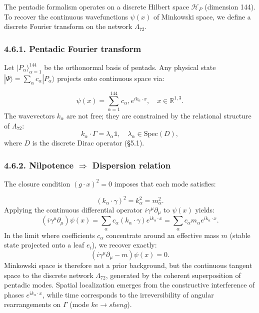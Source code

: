 \documentclass[11pt]{article}
\let\oldmathcal\mathcal
\renewcommand{\mathcal}[1]{\oldmathcal{#1}}
\begin{document}
The pentadic formalism operates on a discrete Hilbert space
\(\mathcal{H}_P\) (dimension 144). To recover the continuous
wavefunctions \(\psi(x)\) of Minkowski space, we define a discrete
Fourier transform on the network \(\Lambda_{72}\).

\hypertarget{pentadic-fourier-transform}{%
\subsubsection{4.6.1. Pentadic Fourier
transform}\label{pentadic-fourier-transform}}

Let \({|P_\alpha\rangle}_{\alpha=1}^{144}\) be the orthonormal basis of
pentads. Any physical state
\(|\Psi\rangle = \sum_\alpha c_\alpha |P_\alpha\rangle\) projects onto
continuous space via:

\[
\psi(x) = \sum_{\alpha=1}^{144} c_\alpha , e^{i k_\alpha \cdot x}, \quad x \in \mathbb{R}^{1,3}.
\] The wavevectors \(k_\alpha\) are not free; they are constrained by
the relational structure of \(\Lambda_{72}\): \[
k_\alpha \cdot \Gamma = \lambda_\alpha \mathbb{1}, \quad \lambda_\alpha \in \text{Spec}(D),
\] where \(D\) is the discrete Dirac operator (§5.1).

\hypertarget{nilpotence-rightarrow-dispersion-relation}{%
\subsubsection{\texorpdfstring{4.6.2. Nilpotence \(\Rightarrow\)
Dispersion
relation}{4.6.2. Nilpotence \textbackslash Rightarrow Dispersion relation}}\label{nilpotence-rightarrow-dispersion-relation}}

The closure condition \((g\cdot x)^2=0\) imposes that each mode
satisfies:

\[
(k_\alpha \cdot \gamma)^2 = k_\alpha^2 = m_\alpha^2.
\] Applying the continuous differential operator
\(i\gamma^\mu \partial_\mu\) to \(\psi(x)\) yields: \[
(i\gamma^\mu \partial_\mu) \psi(x) = \sum_\alpha c_\alpha (k_\alpha \cdot \gamma) e^{i k_\alpha \cdot x} = \sum_\alpha c_\alpha m_\alpha e^{i k_\alpha \cdot x}.
\] In the limit where coefficients \(c_\alpha\) concentrate around an
effective mass \(m\) (stable state projected onto a leaf \(e_i\)), we
recover exactly: \[
(i\gamma^\mu \partial_\mu - m)\psi(x) = 0.
\] Minkowski space is therefore not a prior background, but the
continuous tangent space to the discrete network \(\Lambda_{72}\),
generated by the coherent superposition of pentadic modes. Spatial
localization emerges from the constructive interference of phases
\(e^{i k_\alpha \cdot x}\), while time corresponds to the
irreversibility of angular rearrangements on \(\Gamma\) (mode
\(ke \to sheng\)).
\end{document}
